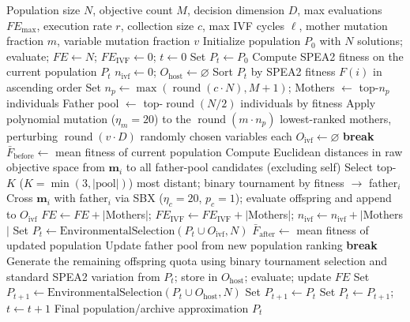 \documentclass[pdflatex,sn-mathphys-ay]{sn-jnl}%
\theoremstyle{thmstyleone}%
\theoremstyle{thmstyletwo}%
\theoremstyle{thmstylethree}%
\begin{document}
\begin{algorithm}[!htbp]
	\caption{IVF/SPEA2 under a fixed function evaluation budget}\label{alg:ivf-spea2}
	\small
	\begin{algorithmic}[1]
		\Require Population size $N$, objective count $M$, decision dimension $D$, max evaluations $FE_{\max}$, execution rate $r$, collection size $c$, max IVF cycles $\ell$, mother mutation fraction $m$, variable mutation fraction $v$
		\State Initialize population $P_0$ with $N$ solutions; evaluate; $FE \gets N$; $FE_{\text{IVF}} \gets 0$; $t \gets 0$
		\State Set $P_t \gets P_0$
		\State Compute SPEA2 fitness on the current population $P_t$
		\State $n_{\text{ivf}} \gets 0$; $O_{\text{host}} \gets \varnothing$
		 
		\State Sort $P_t$ by SPEA2 fitness $F(i)$ in ascending order
		\State Set $n_p \gets \max(\operatorname{round}(c\cdot N), M+1)$; Mothers $\gets$ top-$n_p$ individuals
		\State Father pool $\gets$ top-$\operatorname{round}(N/2)$ individuals by fitness
		\State Apply polynomial mutation ($\eta_m=20$) to the $\operatorname{round}(m \cdot n_p)$ lowest-ranked mothers, perturbing $\operatorname{round}(v \cdot D)$ randomly chosen variables each 
		\State $O_{\text{ivf}} \gets \varnothing$
		 \textbf{break} 
		\EndIf
		\State $\bar{F}_{\text{before}} \gets$ mean fitness of current population
		 
		\State Compute Euclidean distances in raw objective space from $\mathbf{m}_i$ to all father-pool candidates (excluding self)
		\State Select top-$K$ ($K{=}\min(3,|\text{pool}|)$) most distant; binary tournament by fitness $\to$ father$_i$
		\State Cross $\mathbf{m}_i$ with father$_i$ via SBX ($\eta_c{=}20$, $p_c{=}1$); evaluate offspring and append to $O_{\text{ivf}}$
		\EndFor
		\State $FE \gets FE + |$Mothers$|$; $FE_{\text{IVF}} \gets FE_{\text{IVF}} + |$Mothers$|$; $n_{\text{ivf}} \gets n_{\text{ivf}} + |$Mothers$|$
		\State Set $P_t \gets \mathrm{EnvironmentalSelection}(P_t \cup O_{\text{ivf}}, N)$
		\State $\bar{F}_{\text{after}} \gets$ mean fitness of updated population
		 
		\State Update father pool from new population ranking
		\Else
		\State \textbf{break} 
		\EndIf
		\EndFor
		\EndIf
		\State Generate the remaining offspring quota using binary tournament selection and standard SPEA2 variation from $P_t$; store in $O_{\text{host}}$; evaluate; update $FE$
		\State Set $P_{t+1} \gets \mathrm{EnvironmentalSelection}(P_t \cup O_{\text{host}}, N)$
		\Else
		\State Set $P_{t+1} \gets P_t$
		\EndIf
		\State Set $P_t \gets P_{t+1}$; $t \gets t+1$
		\EndWhile
		\State \Return Final population/archive approximation $P_t$
	\end{algorithmic}
\end{algorithm}
\end{document}
